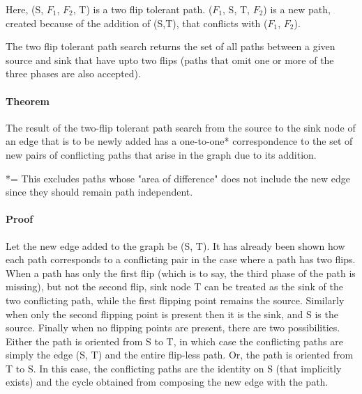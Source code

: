 \documentclass{article}
\begin{document}
\begin{center}
\end{center}
Here, (S, $F_1$, $F_2$, T) is a two flip tolerant path. ($F_1$, S, T, $F_2$) is a new path, created because of the addition of (S,T), that conflicts with ($F_1$, $F_2$).

The two flip tolerant path search returns the set of all paths between a given source and sink that have upto two flips (paths that omit one or more of the three phases are also accepted).

\paragraph{Theorem} The result of the two-flip tolerant path search from the source to the sink node of an edge that is to be newly added has a one-to-one* correspondence to the set of new pairs of conflicting paths that arise in the graph due to its addition.

*= This excludes paths whose "area of difference" does not include the new edge since they should remain path independent.

\paragraph{Proof}
Let the new edge added to the graph be (S, T).
It has already been shown how each path corresponds to a conflicting pair in the case where a path has two flips. When a path has only the first flip (which is to say, the third phase of the path is missing), but not the second flip, sink node T can be treated as the sink of the two conflicting path, while the first flipping point remains the source. Similarly when only the second flipping point is present then it is the sink, and S is the source. Finally when no flipping points are present, there are two possibilities. 
Either the path is oriented from S to T, in which case the conflicting paths are simply the edge (S, T) and the entire flip-less path.
Or, the path is oriented from T to S. In this case, the conflicting paths are the identity on S (that implicitly exists) and the cycle obtained from composing the new edge with the path.
\end{document}
